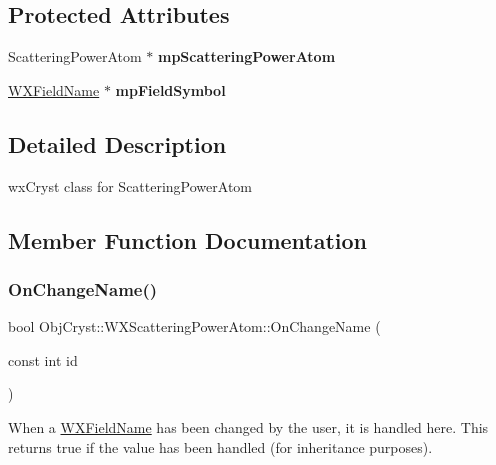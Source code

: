 \subsection*{Protected Attributes}
\begin{DoxyCompactItemize}
\item 
\mbox{\label{class_obj_cryst_1_1_w_x_scattering_power_atom_ac67159595394abeced5050d312048c3b}} 
Scattering\+Power\+Atom $\ast$ {\bfseries mp\+Scattering\+Power\+Atom}
\item 
\mbox{\label{class_obj_cryst_1_1_w_x_scattering_power_atom_ada31b25cf4a32d6a7d959cc0189d4b3c}} 
\mbox{\hyperlink{class_obj_cryst_1_1_w_x_field_name}{W\+X\+Field\+Name}} $\ast$ {\bfseries mp\+Field\+Symbol}
\end{DoxyCompactItemize}


\subsection{Detailed Description}
wx\+Cryst class for Scattering\+Power\+Atom 

\subsection{Member Function Documentation}
\mbox{\label{class_obj_cryst_1_1_w_x_scattering_power_atom_ac1b203e5de8d1827e6dba7f8715d1228}} 
\subsubsection{\texorpdfstring{OnChangeName()}{OnChangeName()}}
{\footnotesize\ttfamily bool Obj\+Cryst\+::\+W\+X\+Scattering\+Power\+Atom\+::\+On\+Change\+Name (\begin{DoxyParamCaption}\item[{const int}]{id }\end{DoxyParamCaption})\hspace{0.3cm}{\ttfamily [virtual]}}

When a \mbox{\hyperlink{class_obj_cryst_1_1_w_x_field_name}{W\+X\+Field\+Name}} has been changed by the user, it is handled here. This returns true if the value has been handled (for inheritance purposes). 

